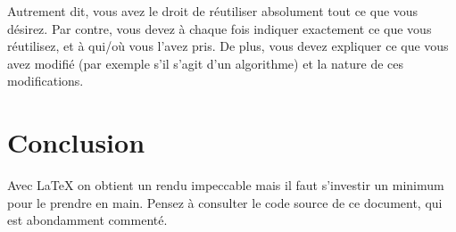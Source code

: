 \documentclass{ceri}
\begin{document}
Autrement dit, vous avez le droit de réutiliser absolument tout ce que vous désirez. Par contre, vous devez à chaque fois indiquer exactement ce que vous réutilisez, et à qui/où vous l'avez pris. De plus, vous devez expliquer ce que vous avez modifié (par exemple s'il s'agit d'un algorithme) et la nature de ces modifications.



\section{Conclusion}
Avec \LaTeX{} on obtient un rendu impeccable mais il faut s'investir un minimum pour le prendre en main. Pensez à consulter le code source de ce document, qui est abondamment commenté.
\end{document}
